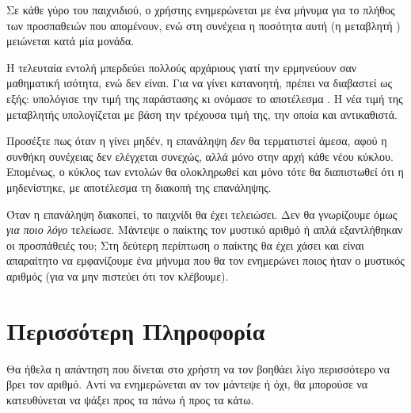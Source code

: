 \documentclass[a4paper,11pt,oneside]{book}
\begin{document}
Σε κάθε γύρο του παιχνιδιού, ο χρήστης ενημερώνεται με ένα μήνυμα για το πλήθος των προσπαθειών που απομένουν, ενώ στη συνέχεια η ποσότητα αυτή (η μεταβλητή ) μειώνεται κατά μία μονάδα.


Η τελευταία εντολή μπερδεύει πολλούς αρχάριους γιατί την ερμηνεύουν σαν μαθηματική ισότητα, ενώ δεν είναι. Για να γίνει κατανοητή, πρέπει να διαβαστεί ως εξής: υπολόγισε την τιμή της παράστασης  κι ονόμασε το αποτέλεσμα . Η νέα τιμή της μεταβλητής  υπολογίζεται με βάση την τρέχουσα τιμή της, την οποία και αντικαθιστά. 

Προσέξτε πως όταν η  γίνει μηδέν, η επανάληψη \emph{δεν} θα τερματιστεί άμεσα, αφού η συνθήκη συνέχειας δεν ελέγχεται συνεχώς, αλλά μόνο στην αρχή κάθε νέου κύκλου. Επομένως, ο κύκλος των εντολών θα ολοκληρωθεί και μόνο τότε θα διαπιστωθεί ότι η  μηδενίστηκε, με αποτέλεσμα τη διακοπή της επανάληψης.

Όταν η επανάληψη διακοπεί, το παιχνίδι θα έχει τελειώσει. Δεν θα γνωρίζουμε όμως \emph{για ποιο λόγο} τελείωσε. Μάντεψε ο παίκτης τον μυστικό αριθμό ή απλά εξαντλήθηκαν οι προσπάθειές του; Στη δεύτερη περίπτωση ο παίκτης θα έχει χάσει και είναι απαραίτητο να εμφανίζουμε ένα μήνυμα που θα τον ενημερώνει ποιος ήταν ο μυστικός αριθμός (για να μην πιστεύει ότι τον κλέβουμε).



\section{Περισσότερη Πληροφορία}

\begin{question}
Θα ήθελα η απάντηση που δίνεται στο χρήστη να τον βοηθάει λίγο περισσότερο να βρει τον αριθμό.
Αντί να ενημερώνεται αν τον μάντεψε ή όχι, θα μπορούσε να κατευθύνεται να ψάξει προς τα πάνω 
ή προς τα κάτω.
\end{question}
\end{document}
